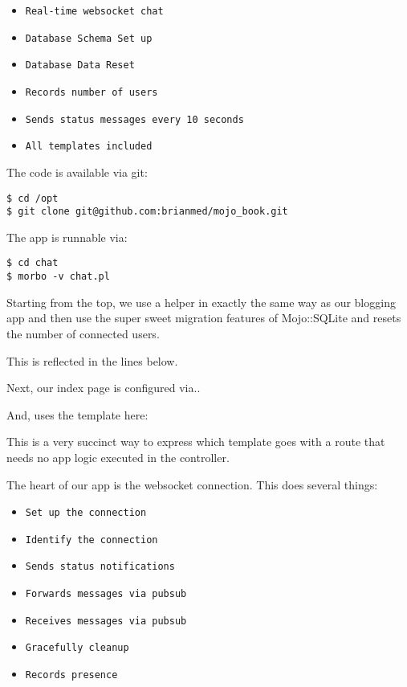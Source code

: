 \documentclass[14pt]{extreport}
\begin{document}
\begin{itemize} \itemsep1pt \parskip0pt 
\item \verb|Real-time websocket chat|
\item \verb|Database Schema Set up|
\item \verb|Database Data Reset|
\item \verb|Records number of users|
\item \verb|Sends status messages every 10 seconds|
\item \verb|All templates included|
\end{itemize}

The code is available via git:

\begin{lstlisting}[style=BashOutputStyle]
$ cd /opt
$ git clone git@github.com:brianmed/mojo_book.git
\end{lstlisting}

The app is runnable via:

\begin{lstlisting}[style=BashInputStyle]
$ cd chat
$ morbo -v chat.pl
\end{lstlisting}

Starting from the top, we use a helper in exactly the same way as our blogging
app and then use the super sweet migration features of Mojo::SQLite and resets the
number of connected users.

This is reflected in the lines below.



Next, our index page is configured via..



And, uses the template here:



This is a very succinct way to express which template goes with a route that
needs no app logic executed in the controller.

The heart of our app is the websocket connection.  This does several things:

\begin{itemize} \itemsep1pt \parskip0pt 
\item \verb|Set up the connection|
\item \verb|Identify the connection|
\item \verb|Sends status notifications|
\item \verb|Forwards messages via pubsub|
\item \verb|Receives messages via pubsub|
\item \verb|Gracefully cleanup|
\item \verb|Records presence|
\end{itemize}
\end{document}
